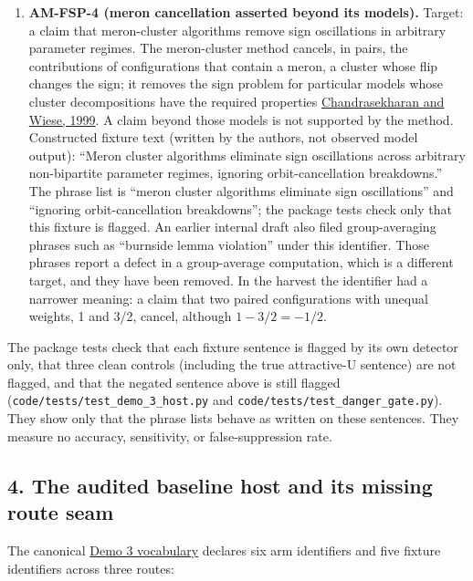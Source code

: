 \documentclass[
  11pt,
]{article}
\begin{document}
\begin{enumerate}
  includes ``majorana decomposition secures positive'' and four phrases
  about Majorana or Clifford lifts, mappings, and representations, such
  as ``continuous majorana lift''.
\item
  \textbf{AM-FSP-4 (meron cancellation asserted beyond its models).}
  Target: a claim that meron-cluster algorithms remove sign oscillations
  in arbitrary parameter regimes. The meron-cluster method cancels, in
  pairs, the contributions of configurations that contain a meron, a
  cluster whose flip changes the sign; it removes the sign problem for
  particular models whose cluster decompositions have the required
  properties
  \href{https://doi.org/10.1103/PhysRevLett.83.3116}{Chandrasekharan and
  Wiese, 1999}. A claim beyond those models is not supported by the
  method. Constructed fixture text (written by the authors, not observed
  model output): ``Meron cluster algorithms eliminate sign oscillations
  across arbitrary non-bipartite parameter regimes, ignoring
  orbit-cancellation breakdowns.'' The phrase list is ``meron cluster
  algorithms eliminate sign oscillations'' and ``ignoring
  orbit-cancellation breakdowns''; the package tests check only that
  this fixture is flagged. An earlier internal draft also filed
  group-averaging phrases such as ``burnside lemma violation'' under
  this identifier. Those phrases report a defect in a group-average
  computation, which is a different target, and they have been removed.
  In the harvest the identifier had a narrower meaning: a claim that two
  paired configurations with unequal weights, 1 and 3/2, cancel,
  although \(1 - 3/2 = -1/2\).
\end{enumerate}

The package tests check that each fixture sentence is flagged by its own
detector only, that three clean controls (including the true
attractive-U sentence) are not flagged, and that the negated sentence
above is still flagged (\nolinkurl{code/tests/test_demo_3_host.py} and
\nolinkurl{code/tests/test_danger_gate.py}). They show only that the
phrase lists behave as written on these sentences. They measure no
accuracy, sensitivity, or false-suppression rate.

\subsection{4. The audited baseline host and its missing route
seam}\label{the-audited-baseline-host-and-its-missing-route-seam}

The canonical
\href{https://github.com/dbccpage/the_symbol_game/blob/52cb5457f6c485ba548cfd292f6012a941ed22cf/omega_engine_pfp/domain/mssn_sn_demos/demo_3/host.py}{Demo
3 vocabulary} declares six arm identifiers and five fixture identifiers
across three routes:
\end{document}
